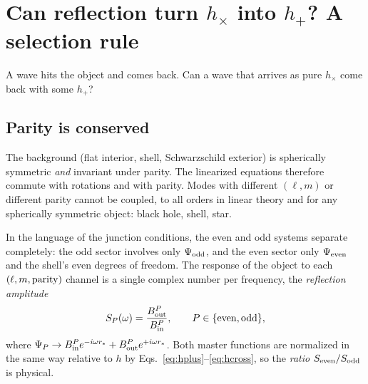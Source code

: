 \section{Can reflection turn $h_\times$ into $h_+$? A selection rule}\label{sec:rule}
\begin{question}
A wave hits the object and comes back. Can a wave that arrives as pure $h_\times$ come back with some $h_+$?
\end{question}

\subsection{Parity is conserved}
\begin{keyidea}
The background (flat interior, shell, Schwarzschild exterior) is spherically symmetric \emph{and} invariant under
parity. The linearized equations therefore commute with rotations and with parity. Modes with different $(\ell,m)$ or
different parity cannot be coupled, to all orders in linear theory and for any spherically symmetric object: black
hole, shell, star.
\end{keyidea}
In the language of the junction conditions, the even and odd systems separate completely: the odd sector involves only
$\Psi_{\rm odd}$, and the even sector only $\Psi_{\rm even}$ and the shell's even degrees of freedom. The response of the
object to each $(\ell,m,{\rm parity})$ channel is a single complex number per frequency, the \emph{reflection amplitude}
\begin{equation}
S_P(\omega)=\frac{B^{P}_{\rm out}}{B^{P}_{\rm in}},\qquad P\in\{{\rm even},{\rm odd}\},
\end{equation}
where $\Psi_P\to B^P_{\rm in}e^{-i\omega r_*}+B^P_{\rm out}e^{+i\omega r_*}$. Both master functions are normalized in the same way
relative to $h$ by Eqs.~\eqref{eq:hplus}--\eqref{eq:hcross}, so the \emph{ratio} $S_{\rm even}/S_{\rm odd}$ is physical.

